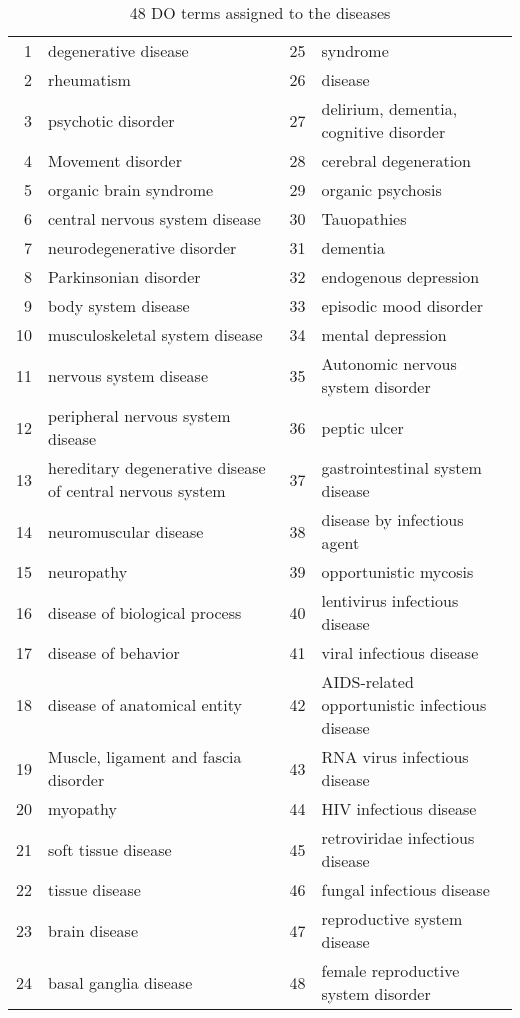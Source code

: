 \documentclass[preprint,12pt]{elsarticle}
\begin{document}
\begin{table}[h]
\centering \scriptsize \caption{48 DO terms assigned to the diseases}\label{doterms}
\begin{tabular}{rlrl}
  \hline
 & &  \\ 
  \hline
1 & degenerative disease & 25 & syndrome \\ 
  2 & rheumatism & 26  &disease \\ 
  3 & psychotic disorder & 27 &delirium, dementia, cognitive disorder \\ 
  4 & Movement disorder & 28&cerebral degeneration \\ 
  5 & organic brain syndrome & 29&organic psychosis \\ 
  6 & central nervous system disease & 30& Tauopathies \\ 
  7 & neurodegenerative disorder & 31&dementia \\ 
  8 & Parkinsonian disorder & 32&endogenous depression \\ 
  9 & body system disease & 33&episodic mood disorder \\ 
  10 & musculoskeletal system disease & 34&mental depression \\ 
  11 & nervous system disease &35& Autonomic nervous system disorder \\ 
  12 & peripheral nervous system disease & 36&peptic ulcer \\ 
  13 & hereditary degenerative disease of central nervous system & 37&gastrointestinal system disease \\ 
  14 & neuromuscular disease & 38&disease by infectious agent \\ 
  15 & neuropathy & 39&opportunistic mycosis \\ 
  16 & disease of biological process & 40&lentivirus infectious disease \\ 
  17 & disease of behavior & 41&viral infectious disease \\ 
  18 & disease of anatomical entity & 42&AIDS-related opportunistic infectious disease \\ 
  19 & Muscle, ligament and fascia disorder & 43&RNA virus infectious disease \\ 
  20 & myopathy & 44&HIV infectious disease \\ 
  21 & soft tissue disease & 45&retroviridae infectious disease \\ 
  22 & tissue disease & 46&fungal infectious disease \\ 
  23 & brain disease & 47&reproductive system disease \\ 
  24 & basal ganglia disease & 48&female reproductive system disorder \\ 
   \hline
\end{tabular}
\end{table}
\normalsize
\end{document}
